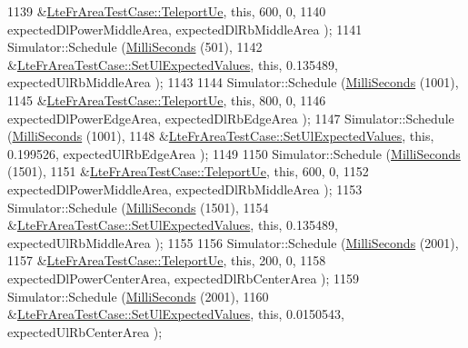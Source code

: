 \begin{DoxyCode}
1139                        &\hyperlink{classLteFrAreaTestCase_ad644210c338d4e34da3c5d7f0c511269}{LteFrAreaTestCase::TeleportUe}, \textcolor{keyword}{this}, 600, 0,
1140                        expectedDlPowerMiddleArea, expectedDlRbMiddleArea );
1141   Simulator::Schedule (\hyperlink{group__timecivil_gaf26127cf4571146b83a92ee18679c7a9}{MilliSeconds} (501),
1142                        &\hyperlink{classLteFrAreaTestCase_aac2718dc3703d2ad389f88ffa20d035e}{LteFrAreaTestCase::SetUlExpectedValues}, \textcolor{keyword}{this},
       0.135489, expectedUlRbMiddleArea );
1143 
1144   Simulator::Schedule (\hyperlink{group__timecivil_gaf26127cf4571146b83a92ee18679c7a9}{MilliSeconds} (1001),
1145                        &\hyperlink{classLteFrAreaTestCase_ad644210c338d4e34da3c5d7f0c511269}{LteFrAreaTestCase::TeleportUe}, \textcolor{keyword}{this}, 800, 0,
1146                        expectedDlPowerEdgeArea, expectedDlRbEdgeArea );
1147   Simulator::Schedule (\hyperlink{group__timecivil_gaf26127cf4571146b83a92ee18679c7a9}{MilliSeconds} (1001),
1148                        &\hyperlink{classLteFrAreaTestCase_aac2718dc3703d2ad389f88ffa20d035e}{LteFrAreaTestCase::SetUlExpectedValues}, \textcolor{keyword}{this},
       0.199526, expectedUlRbEdgeArea );
1149 
1150   Simulator::Schedule (\hyperlink{group__timecivil_gaf26127cf4571146b83a92ee18679c7a9}{MilliSeconds} (1501),
1151                        &\hyperlink{classLteFrAreaTestCase_ad644210c338d4e34da3c5d7f0c511269}{LteFrAreaTestCase::TeleportUe}, \textcolor{keyword}{this}, 600, 0,
1152                        expectedDlPowerMiddleArea, expectedDlRbMiddleArea );
1153   Simulator::Schedule (\hyperlink{group__timecivil_gaf26127cf4571146b83a92ee18679c7a9}{MilliSeconds} (1501),
1154                        &\hyperlink{classLteFrAreaTestCase_aac2718dc3703d2ad389f88ffa20d035e}{LteFrAreaTestCase::SetUlExpectedValues}, \textcolor{keyword}{this},
       0.135489, expectedUlRbMiddleArea );
1155 
1156   Simulator::Schedule (\hyperlink{group__timecivil_gaf26127cf4571146b83a92ee18679c7a9}{MilliSeconds} (2001),
1157                        &\hyperlink{classLteFrAreaTestCase_ad644210c338d4e34da3c5d7f0c511269}{LteFrAreaTestCase::TeleportUe}, \textcolor{keyword}{this}, 200, 0,
1158                        expectedDlPowerCenterArea, expectedDlRbCenterArea );
1159   Simulator::Schedule (\hyperlink{group__timecivil_gaf26127cf4571146b83a92ee18679c7a9}{MilliSeconds} (2001),
1160                        &\hyperlink{classLteFrAreaTestCase_aac2718dc3703d2ad389f88ffa20d035e}{LteFrAreaTestCase::SetUlExpectedValues}, \textcolor{keyword}{this},
       0.0150543, expectedUlRbCenterArea );

\end{DoxyCode}
